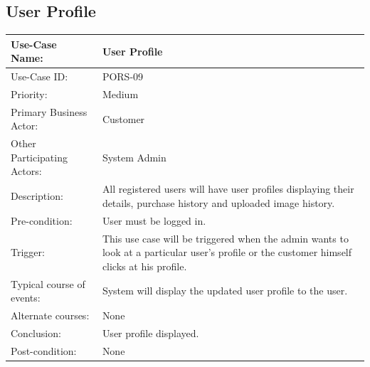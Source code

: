 \subsection{User Profile}
\begin{center}
    \begin{tabular}{ @{}|p{7cm}||p{7cm}|  }
    \hline
    Use-Case Name: & User Profile \\ \hline
    Use-Case ID: & PORS-09 \\ \hline
    Priority: & Medium \\ \hline
    Primary Business Actor: & Customer \\ \hline
    Other Participating Actors: & System Admin \\ \hline
    Description: & All registered users will have user profiles displaying their details, purchase history and uploaded image history. \\ \hline
    Pre-condition: & User must be logged in. \\ \hline
    Trigger: & This use case will be triggered when the admin wants to look at a particular user’s profile or the customer himself clicks at his profile. \\ \hline
    Typical course of events: &  System will display the updated user profile to the user. \\ \hline
    Alternate courses: & None \\ \hline
    Conclusion: &  User profile displayed.\\ \hline
    Post-condition: &  None\\ \hline
    \end{tabular}
\end{center}

